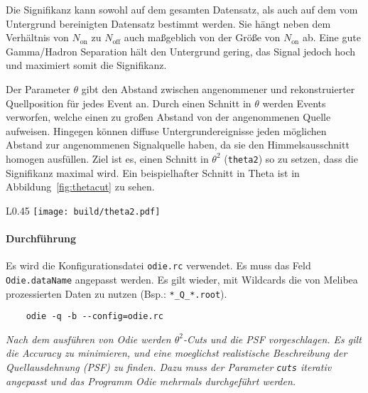 Die Signifikanz kann sowohl auf dem gesamten Datensatz,
als auch auf dem vom Untergrund bereinigten Datensatz bestimmt werden. %
Sie hängt neben dem Verhältnis von $N_\text{on}$ zu $N_\text{off}$ auch
maßgeblich von der Größe von $N_\text{on}$ ab.
Eine gute Gamma/Hadron Separation hält den Untergrund gering,
das Signal jedoch hoch
und maximiert somit die Signifikanz.

Der Parameter $\theta$ gibt den Abstand zwischen
angenommener und rekonstruierter Quellposition
für jedes Event an.
Durch einen Schnitt in $\theta$ werden Events verworfen,
welche einen zu großen Abstand von der angenommenen Quelle aufweisen.
Hingegen können diffuse Untergrundereignisse jeden möglichen Abstand zur
angenommenen Signalquelle haben,
da sie den Himmelsausschnitt homogen ausfüllen.
Ziel ist es, einen Schnitt in $\theta^2$ (\texttt{theta2}) so zu setzen,
dass die Signifikanz maximal wird.
Ein beispielhafter Schnitt in Theta ist in
Abbildung~\ref{fig:thetacut} zu sehen.

\begin{wrapfigure}[12]{L}{0.45\textwidth}
		\centering
		\texttt{[image: build/theta2.pdf]}
		\caption{Theta2 Schnitt auf Daten zur Maximierung der Signifikanz.}%
		\label{fig:thetacut}
\end{wrapfigure}

\paragraph{Durchführung}%

Es wird die Konfigurationsdatei \texttt{odie.rc} verwendet.
Es muss das Feld \texttt{Odie.dataName} angepasst werden.
Es gilt wieder, mit Wildcards die von Melibea prozessierten Daten zu nutzen
(Bsp.: \texttt{*\_Q\_*.root}).

\begin{lstlisting}
	odie -q -b --config=odie.rc
\end{lstlisting}

\textit{Nach dem ausführen von Odie werden $\theta^2$-Cuts und die PSF vorgeschlagen.
Es gilt die Accuracy zu minimieren,
und eine moeglichst realistische Beschreibung der Quellausdehnung (PSF) zu finden.
Dazu muss der Parameter \texttt{cuts} iterativ angepasst und das Programm Odie
mehrmals durchgeführt werden.
}
